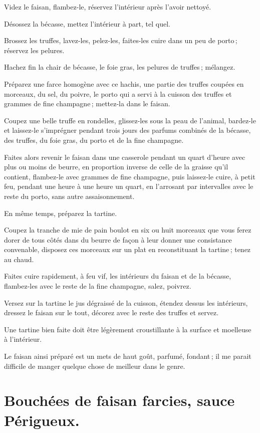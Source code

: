 Videz le faisan, flambez-le, réservez l'intérieur après l'avoir nettoyé.

Désossez la bécasse, mettez l'intérieur à part, tel quel.

Brossez les truffes, lavez-les, pelez-les, faites-les cuire dans un peu de porto ;
réservez les pelures.

Hachez fin la chair de bécasse, le foie gras, les pelures de truffes ;
mélangez.

Préparez une farce homogène avec ce hachis, une partie des truffes coupées en
morceaux, du sel, du poivre, le porto qui a servi à la cuisson des truffes et
{\mmm} grammes de fine champagne ; mettez-la dans le faisan.

Coupez une belle truffe en rondelles, glissez-les sous la peau de l'animal,
bardez-le et laissez-le s'imprégner pendant trois jours des parfums combinés de
la bécasse, des truffes, du foie gras, du porto et de la fine champagne.

Faites alors revenir le faisan dans une casserole pendant un quart d'heure avec
plus ou moins de beurre, en proportion inverse de celle de la graisse qu'il
contient, flambez-le avec {\mmm} grammes de fine champagne, puis
laissez-le cuire, à petit feu, pendant une heure à une heure un quart, en
l'arrosant par intervalles avec le reste du porto, sans autre assaisonnement.

En même temps, préparez la tartine.

Coupez la tranche de mie de pain boulot en six ou huit morceaux que vous ferez
dorer de tous côtés dans du beurre de façon à leur donner une consistance
convenable, disposez ces morceaux sur un plat en reconstituant la tartine ;
tenez au chaud.

Faites cuire rapidement, à feu vif, les intérieurs du faisan et de la bécasse,
flambez-les avec le reste de la fine champagne, salez, poivrez.

Versez sur la tartine le jus dégraissé de la cuisson, étendez dessus les
intérieurs, dressez le faisan sur le tout, décorez avec le reste des truffes et
servez.

Une tartine bien faite doit être légèrement croustillante à la surface et
moelleuse à l'intérieur.

Le faisan ainsi préparé est un mets de haut goût, parfumé, fondant ; il me
parait difficile de manger quelque chose de meilleur dans le genre.

\section*{\centering Bouchées de faisan farcies, sauce Périgueux.}
{}

